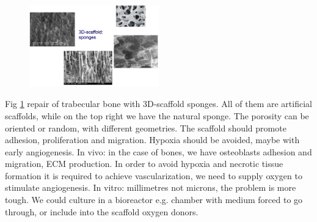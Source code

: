 \begin{figure}[h]
\centering
\includegraphics[width=0.5\textwidth]{sponge}
\caption{\label{fig:sponge}}
\end{figure}
\noindent
Fig \ref{fig:sponge} repair of trabecular bone with 3D-scaffold sponges.
All of them are artificial scaffolds, while on the top right we have the natural sponge.
The porosity can be oriented or random, with different geometries.
The scaffold should promote adhesion, proliferation and migration. Hypoxia should be avoided, maybe with early angiogenesis.
In vivo: in the case of bones, we have osteoblasts adhesion and migration, ECM production. In order to avoid hypoxia and necrotic tissue formation it is required to achieve vascularization, we need to supply oxygen to stimulate angiogenesis.
In vitro: millimetres not microns, the problem is more tough. We could culture in a bioreactor e.g. chamber with medium forced to go through, or include into the scaffold oxygen donors.

